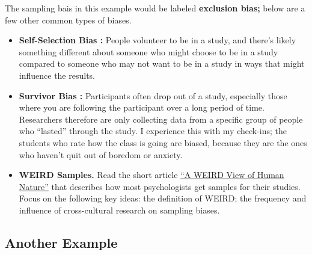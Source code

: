 \documentclass[
  letterpaper,
  DIV=11,
  numbers=noendperiod,
  oneside]{scrreprt}
\providecommand{\tightlist}{%
  \setlength{\itemsep}{0pt}\setlength{\parskip}{0pt}}\usepackage{longtable,booktabs,array}
\begin{document}
The sampling bais in this example would be labeled \textbf{exclusion
bias;} below are a few other common types of biases.

\begin{itemize}
\tightlist
\item
  \textbf{Self-Selection Bias :} People volunteer to be in a study, and
  there's likely something different about someone who might choose to
  be in a study compared to someone who may not want to be in a study in
  ways that might influence the results.
\item
  \textbf{Survivor Bias :} Participants often drop out of a study,
  especially those where you are following the participant over a long
  period of time. Researchers therefore are only collecting data from a
  specific group of people who ``lasted'' through the study. I
  experience this with my check-ins; the students who rate how the class
  is going are biased, because they are the ones who haven't quit out of
  boredom or anxiety.
\item
  \textbf{WEIRD Samples.} Read the short article
  \href{https://www.dropbox.com/s/p9rszc3afaiwmcs/2010_WEIRDinScience.pdf?dl=0}{``A
  WEIRD View of Human Nature''} that describes how most psychologists
  get samples for their studies. Focus on the following key ideas: the
  definition of WEIRD; the frequency and influence of cross-cultural
  research on sampling biases.
\end{itemize}

\subsection{Another Example}\label{another-example-1}
\end{document}
